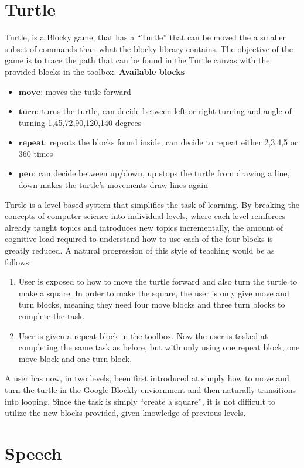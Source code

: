 \documentclass[]{article}
\begin{document}
\section{Turtle}
Turtle, is a Blocky game, that has a ``Turtle” that can be moved the a smaller subset of commands
than what the blocky library contains. The objective of the game is to trace the path that can be found
in the Turtle canvas with the provided blocks in the toolbox. 
\textbf{Available blocks}
\begin{itemize}
  \item $\textbf{move}$: moves the tutle forward
  \item $\textbf{turn}$: turns the turtle, can decide between left or right turning and angle of turning  1,45,72,90,120,140 degrees
  \item $\textbf{repeat}$: repeats the blocks found inside, can decide to repeat either 2,3,4,5 or 360 times
  \item $\textbf{pen}$: can decide between up/down, up stops the turtle from drawing a line, down makes the turtle's movements draw lines again
\end{itemize}
Turtle is a level based system that simplifies the task of learning. By breaking the concepts of computer science into individual
levels, where each level reinforces already taught topics and introduces new topics incrementally, the amount of cognitive load
required to understand how to use each of the four blocks is greatly reduced. A natural progression of this style of teaching would be as follows:
\begin{enumerate}
  \item User is exposed to how to move the turtle forward and also turn the turtle to make a square. In order to make the square, the user
    is only give move and turn blocks, meaning they need four move blocks and three turn blocks to complete the task.
  \item User is given a repeat block in the toolbox. Now the user is tasked at completing the same task as before, but with only using one repeat
    block, one move block and one turn block.
\end{enumerate}
A user has now, in two levels, been first introduced at simply how to move and turn the turtle in the Google Blockly enviornment and then
naturally transitions into looping. Since the task is simply ``create a square'', it is not difficult to utilize the new blocks provided,
given knowledge of previous levels.
\section{Speech}
\end{document}

